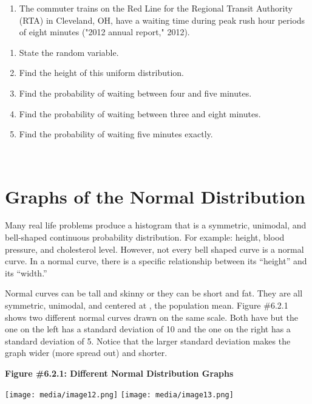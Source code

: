 \documentclass[]{book}
\providecommand{\tightlist}{%
  \setlength{\itemsep}{0pt}\setlength{\parskip}{0pt}}
\begin{document}
\begin{enumerate}
\def\labelenumi{\arabic{enumi}.}
\setcounter{enumi}{1}
\tightlist
\item
  The commuter trains on the Red Line for the Regional Transit
  Authority (RTA) in Cleveland, OH, have a waiting time during peak
  rush hour periods of eight minutes ("2012 annual report," 2012).
\end{enumerate}

\begin{enumerate}
\def\labelenumi{\alph{enumi}.}
\item
  State the random variable.
\item
  Find the height of this uniform distribution.
\item
  Find the probability of waiting between four and five minutes.
\item
  Find the probability of waiting between three and eight minutes.
\item
  Find the probability of waiting five minutes exactly.
\end{enumerate}

\textbf{\\
}

\hypertarget{graphs-of-the-normal-distribution}{%
\section{Graphs of the Normal Distribution}\label{graphs-of-the-normal-distribution}}

Many real life problems produce a histogram that is a symmetric, unimodal, and bell-shaped continuous probability distribution. For example: height, blood pressure, and cholesterol level. However, not every bell shaped curve is a normal curve. In a normal curve, there is a specific relationship between its ``height'' and its ``width.''

Normal curves can be tall and skinny or they can be short and fat. They are all symmetric, unimodal, and centered at , the population mean. Figure \#6.2.1 shows two different normal curves drawn on the same scale. Both have but the one on the left has a standard deviation of 10 and the one on the right has a standard deviation of 5. Notice that the larger standard deviation makes the graph wider (more spread out) and shorter.

\textbf{Figure \#6.2.1: Different Normal Distribution Graphs}

\texttt{[image: media/image12.png]}
\texttt{[image: media/image13.png]}
\end{document}
